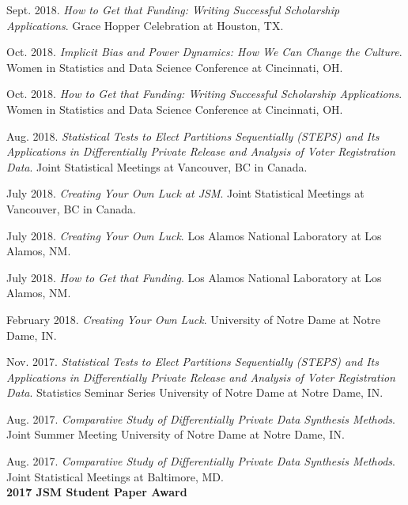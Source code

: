 \documentclass[11pt, letterpaper, roman]{moderncv} %
\begin{document}
\begin{etaremune}[topsep=0pt, itemsep=5pt, partopsep=0pt, parsep=0pt]
  \item Sept. 2018. \textit{How to Get that Funding: Writing Successful Scholarship Applications}. Grace Hopper Celebration at Houston, TX.
  
  \item Oct. 2018. \textit{Implicit Bias and Power Dynamics: How We Can Change the Culture}. Women in Statistics and Data Science Conference at Cincinnati, OH.

  \item Oct. 2018. \textit{How to Get that Funding: Writing Successful Scholarship Applications}. Women in Statistics and Data Science Conference at Cincinnati, OH.

  \item Aug. 2018. \textit{Statistical Tests to Elect Partitions Sequentially (STEPS) and Its Applications in Differentially Private Release and Analysis of Voter Registration Data}. Joint Statistical Meetings at Vancouver, BC in Canada.
  
  \item July 2018. \textit{Creating Your Own Luck at JSM}. Joint Statistical Meetings at Vancouver, BC in Canada.
  
  \item July 2018. \textit{Creating Your Own Luck}. Los Alamos National Laboratory at Los Alamos, NM.
  
  \item July 2018. \textit{How to Get that Funding}. Los Alamos National Laboratory at Los Alamos, NM.
  
  \item February 2018. \textit{Creating Your Own Luck}. University of Notre Dame at Notre Dame, IN.
  
  \item Nov. 2017. \textit{Statistical Tests to Elect Partitions Sequentially (STEPS) and Its Applications in Differentially Private Release and Analysis of Voter Registration Data}. Statistics Seminar Series University of Notre Dame at Notre Dame, IN.
  
  \item Aug. 2017. \textit{Comparative Study of Differentially Private Data Synthesis Methods}. Joint Summer Meeting University of Notre Dame at Notre Dame, IN.

  \item Aug. 2017. \textit{Comparative Study of Differentially Private Data Synthesis Methods}. Joint Statistical Meetings at Baltimore, MD.\\
  \textbf{2017 JSM Student Paper Award}
  

\end{etaremune}
\end{document}
